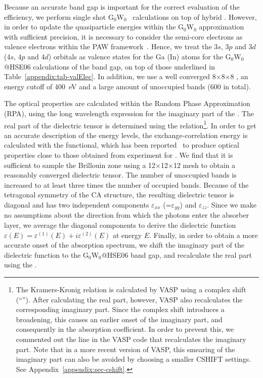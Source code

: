 \begin{refsection}
Because an accurate band gap is important for the correct evaluation of the 
efficiency, we perform single shot G$_0$W$_0$~\cite{Hedin1965} 
calculations on top of hybrid . However, in order to  
update the quasiparticle energies within the G$_0$W$_0$ approximation with 
sufficient precision, it is necessary to consider the semi-core electrons 
as valence electrons within the PAW framework~\cite{Fuchs2007}. Hence, 
we treat the 3$s$, 3$p$ and 3$d$ (4$s$, 4$p$ and 4$d$) orbitals as 
valence states for the Ga (In) atoms for the G$_0$W$_0$@HSE06 calculations 
of the band gap, on top of those underlined in 
Table~\ref{appendix:tab-valElec}. In addition, we use a well converged 
8$\times$8$\times$8 , an energy cutoff of 400~\si{\electronvolt} 
and a large amount of unoccupied bands (600 in total). 
 
The optical properties are calculated within the Random Phase Approximation 
(RPA), using the long wavelength expression for the imaginary part of the 
. The real part of the dielectric 
tensor is determined using the  relation\footnote{The 
Kramers-Kronig relation is calculated by VASP using a complex shift 
(``''). After calculating the real part, however, VASP also 
recalculates the corresponding imaginary part. Since the complex shift 
introduces a broadening, this causes an earlier onset of the imaginary part, 
and consequently in the absorption coefficient. In order to prevent this, we 
commented out the line in the VASP code that recalculates the imaginary 
part. Note that in a more recent version of VASP, this smearing of the 
imaginary part can also be avoided by choosing a smaller CSHIFT settings. 
See Appendix~\ref{appendix:sec-cshift}.}. In order to get an accurate 
description of the energy levels, the 
exchange-correlation energy is calculated with the  functional, 
which has been reported~\cite{Wan2013} to produce optical properties close 
to those obtained from experiment for . We find that 
it is sufficient to sample the Brillouin zone using a 12$\times$12$\times$12 
 mesh to obtain a reasonably converged dielectric tensor. The number 
of unoccupied bands is increased to at least three times the number of 
occupied bands. Because of the tetragonal symmetry of the CA structure, the 
resulting dielectric tensor is 
diagonal and has two independent components $\varepsilon_{xx}$ 
(=$\varepsilon_{yy}$) and $\varepsilon_{zz}$. Since we make no assumptions 
about the direction from which the photons enter the absorber layer, we 
average the diagonal components to derive the dielectric function $\varepsilon 
(E) = \varepsilon^{(1)} (E) + i \varepsilon^{(2)} (E) $ at energy $E$. 
Finally, in order to obtain a more accurate onset of the absorption spectrum, 
we shift the imaginary part of the dielectric function to the G$_0$W$_0$@HSE06 
band gap, and recalculate the real part using the 
.  
 

\end{refsection}
